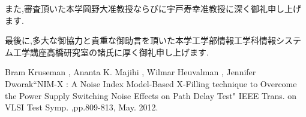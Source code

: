 また,審査頂いた本学岡野大准教授ならびに宇戸寿幸准教授に深く御礼申し上げます.

最後に,多大な御協力と貴重な御助言を頂いた本学工学部情報工学科情報システム工学講座高橋研究室の諸氏に厚く御礼申し上げます.


\begin{thebibliography}{99}

Bram Kruseman , Ananta K. Majihi , Wilmar Heuvalman , Jennifer Dworak“NIM-X : A Noise Index Model-Based X-Filling technique to Overcome the Power Supply Switching Noise Effects on Path Delay Test" IEEE Trans. on VLSI Test Symp. ,pp.809-813, May. 2012.

\end{thebibliography}

